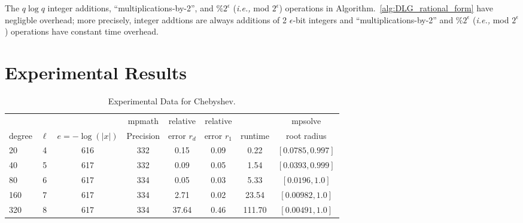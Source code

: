 \documentclass[sigconf]{acmart}
\begin{document}
\begin{theorem}
The $q \log q$  integer additions, ``multiplications-by-2'', and $ \%2^\epsilon $ (\emph{i.e.,} mod $ 2^\epsilon $) operations in Algorithm.~\ref{alg:DLG_rational_form} have negligble overhead; more precisely, integer addtions are always additions of 2 $\epsilon$-bit integers and ``multiplications-by-2'' and $ \%2^\epsilon $ (\emph{i.e.,} mod $ 2^\epsilon $) operations have constant time overhead.
\end{theorem}
\section{Experimental Results}

\begin{table}[t]
\caption{Experimental Data for Chebyshev.}
\label{tab:chebyshev}
\vskip -0.15in
\begin{center}
\begin{small}
\begin{sc}
\begin{tabular}{lccccccc}
\toprule
&  &  & mpmath & relative  & relative &  & mpsolve \\
degree  & $\ell$& $e=-\log(|x|)$& Precision &error $r_d$       & error $r_1$ &runtime& root radius\\
\midrule
 20   & 4 & 616 & 332 & 0.15 & 0.09 & 0.22 &  $[0.0785, 0.997]$ \\
 40   & 5 & 617 & 332 & 0.09 & 0.05 & 1.54 & $[0.0393, 0.999]$ \\
 80   & 6 & 617 & 334 & 0.05 & 0.03 & 5.33 & $[0.0196, 1.0]$ \\
 160 & 7 & 617 & 334 & 2.71 & 0.02 & 23.54 & $[0.00982, 1.0]$ \\
 320 & 8 & 617 & 334 & 37.64 & 0.46 & 111.70 & $[0.00491, 1.0]$ \\
\bottomrule
\end{tabular}
\end{sc}
\end{small}
\end{center}
\vskip 0.05in
\end{table}
\end{document}
